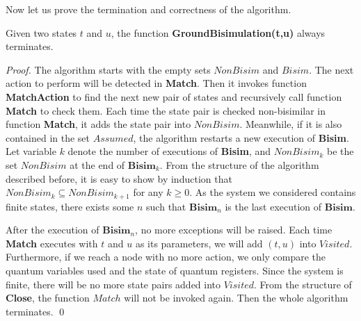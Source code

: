 \documentclass[a4paper,runningheads]{llncs}
\begin{document}
Now let us prove the termination and correctness of the algorithm. 


\begin{theorem}[Termination]\label{thm:termination}
Given two states $t$ and $u$, the function \textbf{GroundBisimulation(t,u)} always terminates.
\end{theorem}
\begin{proof}
The algorithm starts with the empty sets $NonBisim$ and $Bisim$. The next action to perform will be detected in \textbf{Match}. Then it invokes function \textbf{MatchAction} to find the next new pair of states and recursively call function \textbf{Match} to check them. Each time the state pair is checked non-bisimilar in function \textbf{Match}, it adds the state pair into $NonBisim$. Meanwhile, if it is also contained in the set $Assumed$, the algorithm restarts a new execution of \textbf{Bisim}. Let variable $k$ denote the number of executions of \textbf{Bisim}, and $NonBisim_{k}$ be the set $NonBisim$ at the end of $\textbf{Bisim}_{k}$. From the structure of the algorithm described before, it is easy to show by induction that $NonBisim_{k}\subseteq NonBisim_{k+1}$ for any $k\geq 0$. As the system we considered contains finite states, there exists some $n$ such that $\textbf{Bisim}_{n}$ is the last execution of $\textbf{Bisim}$.

After the execution of $\textbf{Bisim}_{n}$, no more exceptions will be raised. Each time \textbf{Match} executes with $t$ and $u$ as its parameters, we will add $(t,u)$ into $Visited$. Furthermore, if we reach a node with no more action, we only compare the quantum variables used and the state of quantum registers. Since the system is finite, there will be no more state pairs added into $Visited$. From the structure of \textbf{Close}, the function $Match$ will not be invoked again. Then the whole algorithm terminates.
\qed
\end{proof}
\end{document}
